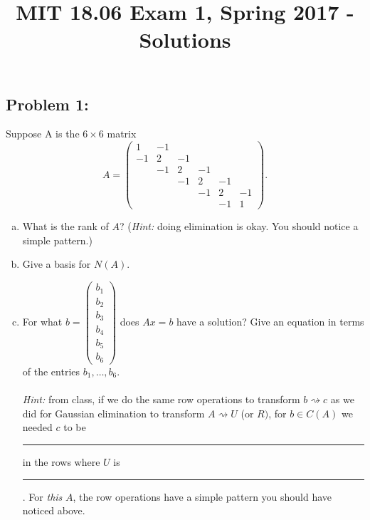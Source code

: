 \documentclass{article}
\title{MIT 18.06 Exam 1, Spring 2017 - Solutions}
\date{}
\begin{document}
\maketitle

\subsection*{Problem 1:}

Suppose A is the $6\times6$ matrix 
\[
A=\left(\begin{array}{cccccc}
1 & -1\\
-1 & 2 & -1\\
 & -1 & 2 & -1\\
 &  & -1 & 2 & -1\\
 &  &  & -1 & 2 & -1\\
 &  &  &  & -1 & 1
\end{array}\right).
\]

\begin{enumerate}[(a)]
\item What is the rank of $A$? (\emph{Hint: }doing elimination is okay.
You should notice a simple pattern.)
\item Give a basis for $N(A)$.
\item For what $b=\left(\begin{array}{c}
b_{1}\\
b_{2}\\
b_{3}\\
b_{4}\\
b_{5}\\
b_{6}
\end{array}\right)$ does $Ax=b$ have a solution? Give an equation in terms of the entries
$b_{1},\ldots,b_{6}$.\emph{}\\
\emph{}\\
\emph{Hint:} from class, if we do the same row operations to transform
$b\rightsquigarrow c$ as we did for Gaussian elimination to transform
$A\rightsquigarrow U$ (or $R)$, for $b\in C(A)$ we needed $c$
to be \rule[-6pt]{0.2\columnwidth}{1pt} in the rows where $U$ is
\rule[-6pt]{0.2\columnwidth}{1pt}. For \emph{this} $A$, the row
operations have a simple pattern you should have noticed above.
\end{enumerate}
\end{document}
